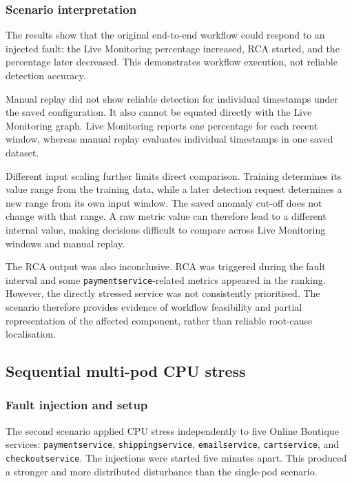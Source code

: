 \subsubsection{Scenario interpretation}

The results show that the original end-to-end workflow could respond to an injected fault: the Live Monitoring percentage increased, RCA started, and the percentage later decreased. This demonstrates workflow execution, not reliable detection accuracy.

Manual replay did not show reliable detection for individual timestamps under the saved configuration. It also cannot be equated directly with the Live Monitoring graph. Live Monitoring reports one percentage for each recent window, whereas manual replay evaluates individual timestamps in one saved dataset.

Different input scaling further limits direct comparison. Training determines its value range from the training data, while a later detection request determines a new range from its own input window. The saved anomaly cut-off does not change with that range. A raw metric value can therefore lead to a different internal value, making decisions difficult to compare across Live Monitoring windows and manual replay.

The RCA output was also inconclusive. RCA was triggered during the fault interval and some \texttt{paymentservice}-related metrics appeared in the ranking. However, the directly stressed service was not consistently prioritised. The scenario therefore provides evidence of workflow feasibility and partial representation of the affected component, rather than reliable root-cause localisation.

\subsection{Sequential multi-pod CPU stress}

\subsubsection{Fault injection and setup}

The second scenario applied CPU stress independently to five Online Boutique services: \texttt{paymentservice}, \texttt{shippingservice}, \texttt{emailservice}, \texttt{cartservice}, and \texttt{checkoutservice}. The injections were started five minutes apart. This produced a stronger and more distributed disturbance than the single-pod scenario.

